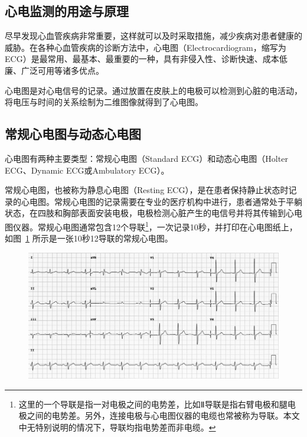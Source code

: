 \subsection{心电监测的用途与原理}\label{subsec:monitoring}

尽早发现心血管疾病非常重要，这样就可以及时采取措施，减少疾病对患者健康的威胁\cite{CardiovascularDiseasesCVDs}。在各种心血管疾病的诊断方法中，心电图（Electrocardiogram，缩写为ECG）是最常用、最基本、最重要的一种，具有非侵入性、诊断快速、成本低廉、广泛可用等诸多优点\cite{Xinxieguanjibingzhenduanliuchengyuzhiliaocelue2007}。

心电图是对心电信号的记录。通过放置在皮肤上的电极可以检测到心脏的电活动，将电压与时间的关系绘制为二维图像就得到了心电图。

\subsection{常规心电图与动态心电图}\label{subsec:standard-holter}

心电图有两种主要类型：常规心电图（Standard ECG）和动态心电图（Holter ECG、Dynamic ECG或Ambulatory ECG）。

常规心电图，也被称为静息心电图（Resting ECG），是在患者保持静止状态时记录的心电图。常规心电图的记录需要在专业的医疗机构中进行，患者通常处于平躺状态，在四肢和胸部表面安装电极，电极检测心脏产生的电信号并将其传输到心电图仪器。常规心电图通常包含12个导联\footnote{这里的一个导联是指一对电极之间的电势差，比如Ⅱ导联是指右臂电极和腿电极之间的电势差。另外，连接电极与心电图仪器的电缆也常被称为导联。本文中无特别说明的情况下，导联均指电势差而非电缆。}，一次记录10秒，并打印在心电图纸上，如图~\ref{fig:ecg-paper-example} 所示是一张10秒12导联的常规心电图。

\begin{figure}[!ht]
    \includegraphics[width=\textwidth]{../assets/ecg-paper-example}
    \label{fig:ecg-paper-example}
\end{figure}

